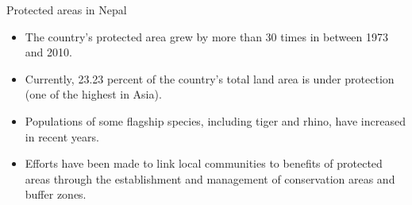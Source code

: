 \documentclass[
  ignorenonframetext,
  aspectratio=169]{beamer}
\providecommand{\tightlist}{%
  \setlength{\itemsep}{0pt}\setlength{\parskip}{0pt}}
\begin{document}
\begin{frame}{Protected areas in Nepal}
\protect\hypertarget{protected-areas-in-nepal}{}
\begin{itemize}
\tightlist
\item
  The country's protected area grew by more than 30 times in between
  1973 and 2010.
\item
  Currently, 23.23 percent of the country's total land area is under
  protection (one of the highest in Asia).
\item
  Populations of some flagship species, including tiger and rhino, have
  increased in recent years.
\item
  Efforts have been made to link local communities to benefits of
  protected areas through the establishment and management of
  conservation areas and buffer zones.
\end{itemize}
\end{frame}
\end{document}
